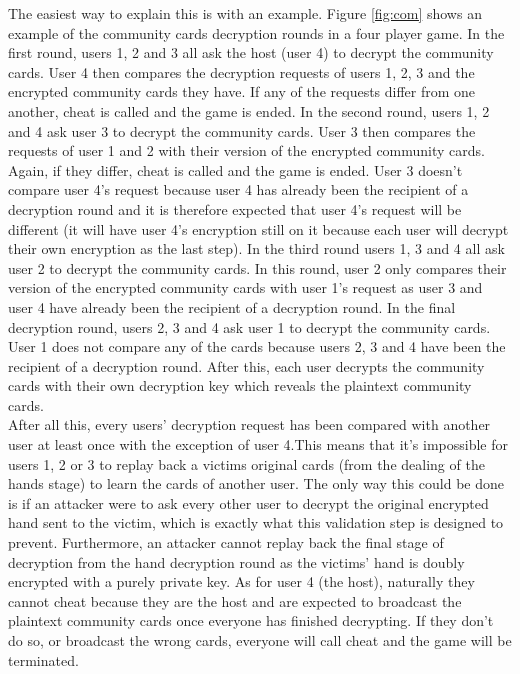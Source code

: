 \documentclass[11pt, oneside]{article}   	%
\begin{document}
The easiest way to explain this is with an example. Figure \ref{fig:com} shows an example of the community cards decryption rounds in a four player game. In the first round, users 1, 2 and 3 all ask the host (user 4) to decrypt the community cards. User 4 then compares the decryption requests of users 1, 2, 3 and the encrypted community cards they have. If any of the requests differ from one another, cheat is called and the game is ended. In the second round, users 1, 2 and 4 ask user 3 to decrypt the community cards. User 3 then compares the requests of user 1 and 2 with their version of the encrypted community cards. Again, if they differ, cheat is called and the game is ended. User 3 doesn't compare user 4’s request because user 4 has already been the recipient of a decryption round and it is therefore expected that user 4’s request will be different (it will have user 4’s encryption still on it because each user will decrypt their own encryption as the last step). In the third round users 1, 3 and 4 all ask user 2 to decrypt the community cards. In this round, user 2 only compares their version of the encrypted community cards with user 1’s request as user 3 and user 4 have already been the recipient of a decryption round. In the final decryption round, users 2, 3 and 4 ask user 1 to decrypt the community cards. User 1 does not compare any of the cards because users 2, 3 and 4 have been the recipient of a decryption round. After this, each user decrypts the community cards with their own decryption key which reveals the plaintext community cards.\\

After all this, every users’ decryption request has been compared with another user at least once with the exception of user 4.This means that it’s impossible for users 1, 2 or 3 to replay back a victims original cards (from the dealing of the hands stage) to learn the cards of another user. The only way this could be done is if an attacker were to ask every other user to decrypt the original encrypted hand sent to the victim, which is exactly what this validation step is designed to prevent. Furthermore, an attacker cannot replay back the final stage of decryption from the hand decryption round as the victims’ hand is doubly encrypted with a purely private key. As for user 4 (the host), naturally they cannot cheat because they are the host and are expected to broadcast the plaintext community cards once everyone has finished decrypting. If they don’t do so, or broadcast the wrong cards, everyone will call cheat and the game will be terminated.
\end{document}
